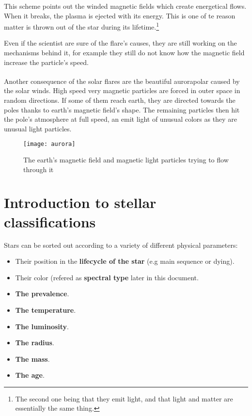\documentclass[a4paper, 11pt]{article} %
\begin{document}
This scheme points out the winded magnetic fields which create energetical flows. When it breaks, the plasma is ejected with its energy. This is one of te reason matter is thrown out of the star during its lifetime.\footnote{The second one being that they emit light, and that light and matter are essentially the same thing.} 

Even if the scientist are sure of the flare's causes, they are still working on the mechanisms behind it, for example they still do not know how the magnetic field increase the particle's speed. 

\paragraph*{}
Another consequence of the solar flares are the beautiful aurorapolar caused by the solar winds. High speed very magnetic particles are forced in outer space in random directions. If some of them reach earth, they are directed towards the poles thanks to earth's magnetic field's shape. The remaining particles then hit the pole's atmosphere at full speed, an emit light of unusual colors as they are unusual light particles.
\begin{figure}[h]
\centering
\texttt{[image: aurora]}
\caption{The earth's magnetic field and magnetic light particles trying to flow through it}
\end{figure}

\section{Introduction to stellar classifications}



Stars can be sorted out according to a variety of different physical parameters:

\begin{itemize}
\item Their position in the \textbf{lifecycle of the star} (e.g main sequence or dying).
\item Their color (refered as \textbf{spectral type} later in this document.
\item \textbf{The prevalence}.
\item \textbf{The temperature}. 
\item \textbf{The luminosity}.
\item \textbf{The radius}.
\item \textbf{The mass}.
\item \textbf{The age}.
\end{itemize}
\end{document}
